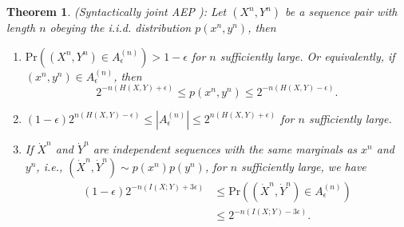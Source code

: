 \documentclass[12pt, draftclsnofoot,onecolumn]{IEEEtran}
\newtheorem{theorem}{\bf{Theorem}}
\begin{document}
\begin{theorem}\label{Syn_JAEP_theorem}
(Syntactically joint AEP \cite[Theorem 7.6.1]{Book_Cover}):
Let $\left(X^n,Y^n\right)$ be a sequence pair with length $n$ obeying the i.i.d. distribution $p(x^n,y^n)$, then
\begin{enumerate}[(1)]
    \item $\text{Pr}((X^n,Y^n)\in A_{\epsilon}^{(n)})>1-\epsilon$ for $n$ sufficiently large. Or equivalently, if $\left(x^n,y^n\right)\in A_{\epsilon}^{(n)}$, then
         \begin{equation}\label{Syn_JAEPinequality}
        2^{-n\left(H(X,Y)+\epsilon\right)}\leq p\left(x^n,y^n\right) \leq 2^{-n\left(H(X,Y)-\epsilon\right)}.
        \end{equation}
    \item $\left(1-\epsilon\right) 2^{n\left(H(X,Y)-\epsilon\right)}\leq \left|A_{\epsilon}^{(n)}\right| \leq 2^{n\left(H(X,Y)+\epsilon\right)}$ for $n$ sufficiently large.
    \item If $\dot{X}^n$ and $\dot{Y}^n$ are independent sequences with the same marginals as $x^n$ and $y^n$, i.e., $(\dot{X}^n,\dot{Y}^n)\sim p(x^n)p(y^n)$, for $n$ sufficiently large, we have
        \begin{equation}
        \begin{aligned}
        (1-\epsilon)2^{-n(I(X;Y)+3\epsilon)}& \leq \text{Pr}\left((\dot{X}^n,\dot{Y}^n)\in A_{\epsilon}^{(n)}\right) \\
                                                               &\leq 2^{-n(I(X;Y)-3\epsilon)}.
        \end{aligned}
        \end{equation}
  \end{enumerate}
\end{theorem}
\end{document}
